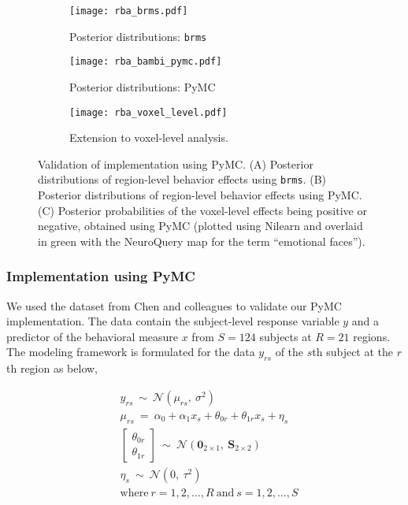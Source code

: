 \documentclass[../main.tex]{subfiles}
\begin{document}
\begin{figure*}[t!]
\centering
\begin{subfigure}{.5\textwidth}
    \centering
    \caption{Posterior distributions: \texttt{brms}}
    \texttt{[image: rba\_brms.pdf]}
    \label{fig:sub1}
\end{subfigure}%
\begin{subfigure}{.5\textwidth}
    \centering
    \caption{Posterior distributions: PyMC}
    \texttt{[image: rba\_bambi\_pymc.pdf]}
    \label{fig:sub2}
\end{subfigure}
\begin{subfigure}{.9\textwidth}
    \centering
    \caption{Extension to voxel-level analysis. }
    \texttt{[image: rba\_voxel\_level.pdf]}
    \label{fig:vox}
\end{subfigure}

\caption{Validation of implementation using PyMC. (A) Posterior distributions of region-level behavior effects using \texttt{brms}. (B) Posterior distributions of region-level behavior effects using PyMC. (C) Posterior probabilities of the voxel-level effects being positive or negative, obtained using PyMC (plotted using Nilearn and overlaid in green with the NeuroQuery\supercite{dockes_neuroquery_2020} map for the term ``emotional faces'').}
\label{fig:rba}
\end{figure*}
\subsubsection{Implementation using PyMC}

We used the dataset from Chen and colleagues\supercite{chenHandlingMultiplicityNeuroimaging2019} to validate our PyMC implementation. The data contain the subject-level response variable $y$ and a predictor of the behavioral measure $x$ from $S=124$ subjects at $R=21$ regions. The modeling framework is formulated for the data $y_{rs}$ of the $s$th subject at the $r$th region as below,

\begin{equation}\label{eq:bml}
    \begin{split}
	&y_{rs}~\sim~\mathcal{N}(\mu_{rs},~\sigma^2) \\
	&\mu_{rs}~=~\alpha_0+\alpha_1 x_s + \theta_{0r}+\theta_{1r} x_s +\eta_s\\
	&\!\!\begin{bmatrix}
	\theta_{0r} \\
	\theta_{1r} 
	\end{bmatrix}~\sim~\mathcal{N}(\boldsymbol{0}_{2\times 1},~\boldsymbol{S}_{2\times 2}) \\
	&\eta_{s}~\sim~\mathcal{N}(0,~\tau^2) \\
	&\text{where}~r=1,2,\ldots,R~\text{and}~s=1,2,\ldots,S
    \end{split}
\end{equation}
\end{document}
